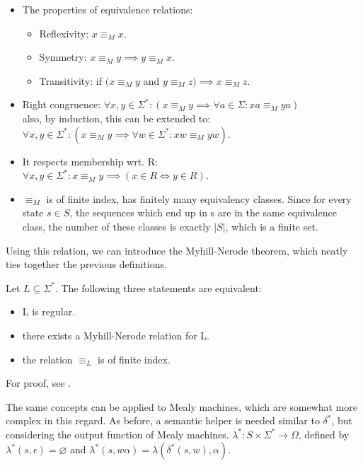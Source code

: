 \begin{itemize}
	\item The properties of equivalence relations:
	\begin{itemize}
		\item Reflexivity: $x\equiv_M x$.
		\item Symmetry: $x\equiv_M y \implies y\equiv_M x$.
		\item Transitivity: if $(x\equiv_M y$ and $y\equiv_M z) \implies x\equiv_M z$.
	\end{itemize}
	\item Right congruence: $\forall x, y\in\Sigma^*: (x\equiv_M y \implies 		\forall a\in\Sigma: xa\equiv_Mya)$\\ also, by induction, this can be extended to:\\
	$\forall x, y\in\Sigma^*: (x\equiv_M y \implies \forall w\in\Sigma^*: xw\equiv_Myw)$. 
	\item It respects membership wrt. R:\\
	$\forall x, y\in\Sigma^*: x\equiv_M y \implies (x\in R \iff y\in R)$.
	\item $\equiv_M$ is of finite index, has finitely many equivalency classes. Since for every state $s\in S$, the sequences which end up in s are in the same equivalence class, the number of these classes is exactly $|S|$, which is a finite set.
\end{itemize}

Using this relation, we can introduce the Myhill-Nerode theorem, which neatly ties together the previous definitions.

\begin{theorem}
	Let $L\subseteq\Sigma^*$. The following three statements are equivalent:
	\begin{itemize}
		\item L is regular.
		\item there exists a Myhill-Nerode relation for L.
		\item the relation $\equiv_L$ is of finite index.
	\end{itemize}
	For proof, see \cite{Kozen1977}\cite{10.2307/2033204}.
\end{theorem}

The same concepts can be applied to Mealy machines, which are somewhat more complex in this regard. As before, a semantic helper is needed similar to $\delta^*$, but considering the output function of Mealy machines. $\lambda^*: S\times\Sigma^* \to \Omega$, defined by $\lambda^*(s, \epsilon) = \varnothing$ and $\lambda^*(s, w\alpha) = \lambda(\delta^*(s, w), \alpha)$.



